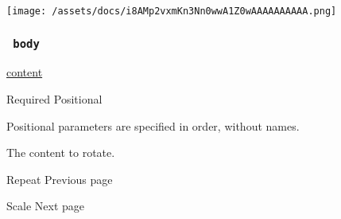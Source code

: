 \texttt{[image: /assets/docs/i8AMp2vxmKn3Nn0wwA1Z0wAAAAAAAAAA.png]}

\subsubsection{\texorpdfstring{\texttt{\ body\ }}{ body }}\label{parameters-body}

\href{/docs/reference/foundations/content/}{content}

{Required} {{ Positional }}

\label{parameters-body-positional-tooltip}
Positional parameters are specified in order, without names.

The content to rotate.

\href{/docs/reference/layout/repeat/}{\pandocbounded{}}

{ Repeat } { Previous page }

\href{/docs/reference/layout/scale/}{\pandocbounded{}}

{ Scale } { Next page }
